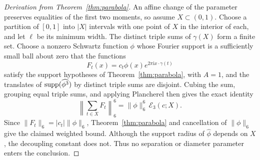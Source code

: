 \documentclass{amsart}
\numberwithin{equation}{section}
\newcommand{\supp}{{\rm supp}}
\begin{document}
\begin{proof}[Derivation from Theorem~\ref{thm:parabola}]
An affine change of the parameter preserves equalities of the first two
moments, so assume $X\subset(0,1)$. Choose a partition of $[0,1]$ into
$|X|$ intervals with one point of $X$ in the interior of each, and let $\ell$
be its minimum width. The distinct triple sums of $\gamma(X)$ form a finite
set. Choose a nonzero Schwartz function $\phi$ whose Fourier support is a
sufficiently small ball about zero that the functions
\[
 F_t(x)=c_t\phi(x)e^{2\pi\mathrm{i} x\cdot\gamma(t)}
\]
satisfy the support hypotheses of Theorem~\ref{thm:parabola}, with $A=1$,
and the translates of $\supp(\widehat{\phi^3})$ by distinct triple sums are
disjoint. Cubing the sum, grouping equal triple sums, and applying Plancherel
then gives the exact identity
\[
 \left\|\sum_{t\in X}F_t\right\|_6^6
 =\|\phi\|_6^6\,\mathcal E_3(c;X).
\]
Since $\|F_t\|_6=|c_t|\|\phi\|_6$, Theorem~\ref{thm:parabola} and cancellation
of $\|\phi\|_6$ give the claimed weighted bound. Although the support radius
of $\widehat\phi$ depends on $X$, the decoupling constant does not. Thus no
separation or diameter parameter enters the conclusion.
\end{proof}

\bigskip



\end{document}
